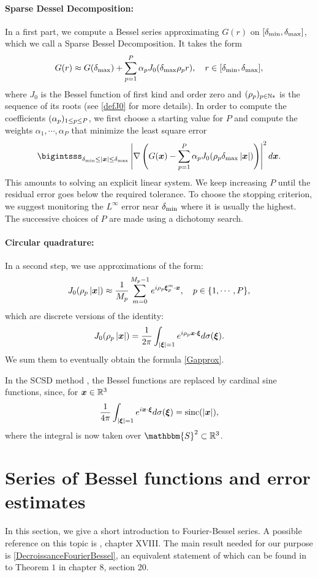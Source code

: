 \documentclass[smallextended]{svjour3}
\begin{document}
\paragraph{Sparse Dessel Decomposition:} In a first part, we compute a Bessel series approximating $G(r)$ on $[\delta_{\min},\delta_{\max}]$, which we call a Sparse Bessel Decomposition. It takes the form
\[G(r) \approx G(\delta_{\max}) + \sum_{p=1}^P \alpha_p J_0(\delta_{\max} \rho_p r), \quad r \in [\delta_{\min},\delta_{\max}],\]
where $J_0$ is the Bessel function of first kind and order zero and $(\rho_p)_{p \in \mathbb{N}*}$ is the sequence of its roots (see \autoref{defJ0} for more details). In order to compute the coefficients $(\alpha_{p})_{1 \leq p \leq P}$, we first choose a starting value for $P$ and compute the weights $\alpha_1,\cdots, \alpha_{P}$ that minimize the least square error
\[\bigintsss_{\rmin \leq |\bs{x}|\leq \rmax} \abs{\nabla \left(G(\bs{x}) - \sum_{p=1}^P \alpha_p J_0(\rho_p \rmax \abs{\bs{x}})\right)}^2 d\bs{x}.\]
This amounts to solving an explicit linear system. We keep increasing $P$ until the residual error goes below the required tolerance. To choose the stopping criterion, we suggest monitoring the $L^{\infty}$ error near $\delta_{\min}$ where it is usually the highest. The successive choices of $P$ are made using a dichotomy search. 
\paragraph{Circular quadrature:}In a second step, we use approximations of the form:
\[J_0(\rho_p \left\lvert \boldsymbol{x} \right\rvert) \approx \dfrac{1}{M_p}\sum_{m=0}^{M_p-1}e^{i \rho_p \boldsymbol{\xi}_p^m \cdot \boldsymbol{x}}, \quad p \in \{1,\cdots,P\},\]
which are discrete versions of the identity:
\[ J_0(\rho_p\left\lvert \boldsymbol{x} \right\rvert) = \frac{1}{2\pi}\int_{\left\lvert \boldsymbol{\xi} \right\rvert=1}{e^{i \rho_p\boldsymbol{x} \cdot \boldsymbol{\xi}}} d\sigma(\boldsymbol{\xi}).\]
We sum them to eventually obtain the formula \eqref{Gapprox}. 
\begin{remark}
	In the SCSD method \cite{Alouges2015}, the Bessel functions are replaced by cardinal sine functions, since, for $\boldsymbol{x} \in \mathbb{R}^3$
	\[ \frac{1}{4\pi}\int_{\left\lvert \boldsymbol{\xi} \right\rvert=1} e^{i \boldsymbol{x}\cdot \boldsymbol{\xi}} d\sigma(\boldsymbol{\xi}) = \textup{sinc}(\left\lvert \boldsymbol{x} \right\rvert),\]
	where the integral is now taken over $\mathbbm{S}^2 \subset \R^3$.
\end{remark}



\section{Series of Bessel functions and error estimates}
\label{sec:FourierBesselSeries}
In this section, we give a short introduction to Fourier-Bessel series. A possible reference on this topic is \cite{watson1995treatise}, chapter XVIII. 
The main result needed for our purpose is \autoref{DecroissanceFourierBessel},  an equivalent statement of which can be found in to Theorem $1$ in \cite{tolstov2012fourier} chapter 8, section 20. 
\end{document}
